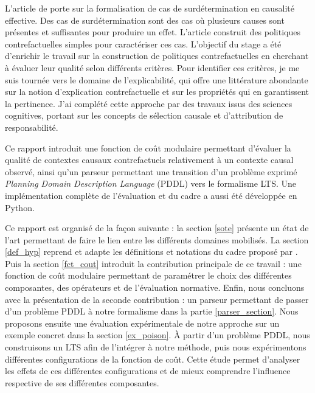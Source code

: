 L'article de \textcite{sarmiento2023actionlanguagesbasedactual} porte sur la formalisation de cas de surdétermination en causalité effective. Des cas de surdétermination sont des cas où plusieurs causes sont présentes et suffisantes pour produire un effet. L'article construit des politiques contrefactuelles simples pour caractériser ces cas. L'objectif du stage a été d'enrichir le travail sur la construction de politiques contrefactuelles en cherchant à évaluer leur qualité selon différents critères. Pour identifier ces critères, je me suis tournée vers le domaine de l'explicabilité, qui offre une littérature abondante sur la notion d'explication contrefactuelle et sur les propriétés qui en garantissent la pertinence. J'ai complété cette approche par des travaux issus des sciences cognitives, portant sur les concepts de sélection causale et d'attribution de responsabilité. 

Ce rapport introduit une fonction de coût modulaire permettant d'évaluer la qualité de contextes causaux contrefactuels relativement à un contexte causal observé, ainsi qu'un parseur permettant une transition d'un problème exprimé \textit{Planning Domain Description Language} (PDDL) vers le formalisme LTS. Une implémentation complète de l'évaluation et du cadre a aussi été développée en Python.

Ce rapport est organisé de la façon suivante : la section \ref{sote} présente un état de l'art permettant de faire le lien entre les différents domaines mobilisés. La section \ref{def_hyp} reprend et adapte les définitions et notations  du cadre proposé par \textcite{sarmiento_formalising_2025}. Puis la section \ref{fct_cout} introduit la contribution principale de ce travail : une fonction de coût modulaire permettant de paramétrer le choix des différentes composantes, des opérateurs et de l'évaluation normative. Enfin, nous concluons avec la présentation de la seconde contribution : un parseur permettant de passer d'un problème PDDL à notre formalisme dans la partie \ref{parser_section}. Nous proposons ensuite une évaluation expérimentale de notre approche sur un exemple concret dans la section \ref{ex_poison}. À partir d'un problème PDDL, nous construisons un LTS afin de l'intégrer à notre méthode, puis nous expérimentons différentes configurations de la fonction de coût. Cette étude permet d'analyser les effets de ces différentes configurations et de mieux comprendre l'influence respective de ses différentes composantes.






\newpage